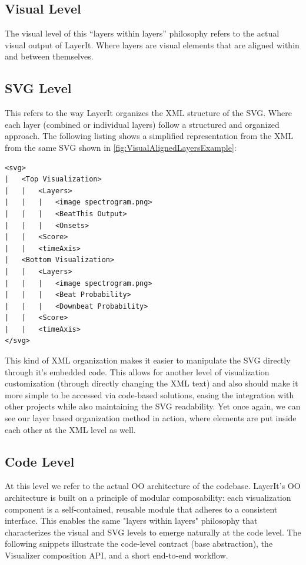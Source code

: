 \subsection{Visual Level}
The visual level of this ``layers within layers'' philosophy refers to the actual visual output of LayerIt. Where layers are visual elements that are aligned within and between themselves. 

\subsection{SVG Level}
This refers to the way LayerIt organizes the XML structure of the SVG. Where each layer (combined or individual layers) follow a structured and organized approach. The following listing shows a simplified representation from the XML from the same SVG shown in  \autoref{fig:VisualAlignedLayersExample}:

\begin{lstlisting}[caption={Example structure of an SVG file},label={lst:svg-example}]
<svg>
|   <Top Visualization>
|   |   <Layers>
|   |   |   <image spectrogram.png>
|   |   |   <BeatThis Output>
|   |   |   <Onsets>
|   |   <Score>
|   |   <timeAxis>
|   <Bottom Visualization>
|   |   <Layers>
|   |   |   <image spectrogram.png>
|   |   |   <Beat Probability>
|   |   |   <Downbeat Probability>
|   |   <Score>
|   |   <timeAxis>
</svg>
\end{lstlisting}

This kind of XML organization makes it easier to manipulate the SVG directly through it's embedded code. This allows for another level of visualization customization (through directly changing the XML text) and also should make it more simple to be accessed via code-based solutions, easing the integration with other projects while also maintaining the SVG readability.  Yet once again, we can see our layer based organization method in action, where elements are put inside each other at the XML level as well. 

\subsection{Code Level}

At this level we refer to the actual OO architecture of the codebase. LayerIt's OO architecture is built on a principle of modular composability: each visualization component is a self-contained, reusable module that adheres to a consistent interface. This enables the same "layers within layers" philosophy that characterizes the visual and SVG levels to emerge naturally at the code level. The following snippets illustrate the code-level contract (base abstraction), the Visualizer composition API, and a short end-to-end workflow.


